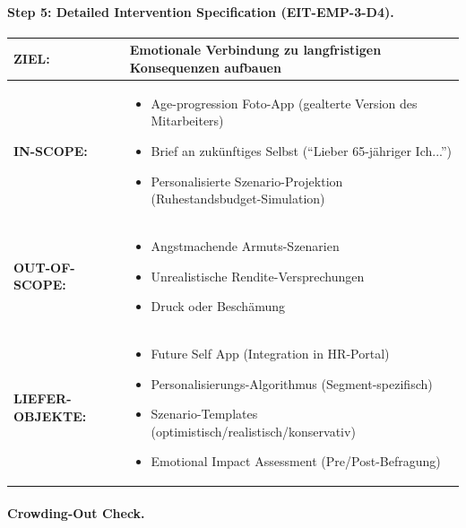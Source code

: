 \paragraph{Step 5: Detailed Intervention Specification (EIT-EMP-3-D4).}

\begin{tcolorbox}[colback=blue!5!white, colframe=blue!75!black,
    title=\textbf{Future Self Visualization --- Full Specification}]

\begin{tabular}{@{}p{2.5cm}p{10cm}@{}}
\textbf{ZIEL:} & Emotionale Verbindung zu langfristigen Konsequenzen aufbauen \\
\midrule
\textbf{IN-SCOPE:} &
\begin{itemize}[nosep,leftmargin=*]
    \item[\checkmark] Age-progression Foto-App (gealterte Version des Mitarbeiters)
    \item[\checkmark] Brief an zukünftiges Selbst (``Lieber 65-jähriger Ich...'')
    \item[\checkmark] Personalisierte Szenario-Projektion (Ruhestandsbudget-Simulation)
\end{itemize} \\
\midrule
\textbf{OUT-OF-SCOPE:} &
\begin{itemize}[nosep,leftmargin=*]
    \item[$\times$] Angstmachende Armuts-Szenarien
    \item[$\times$] Unrealistische Rendite-Versprechungen
    \item[$\times$] Druck oder Beschämung
\end{itemize} \\
\midrule
\textbf{LIEFER-OBJEKTE:} &
\begin{itemize}[nosep,leftmargin=*]
    \item[$\square$] Future Self App (Integration in HR-Portal)
    \item[$\square$] Personalisierungs-Algorithmus (Segment-spezifisch)
    \item[$\square$] Szenario-Templates (optimistisch/realistisch/konservativ)
    \item[$\square$] Emotional Impact Assessment (Pre/Post-Befragung)
\end{itemize} \\
\end{tabular}

\end{tcolorbox}

\paragraph{Crowding-Out Check.}

